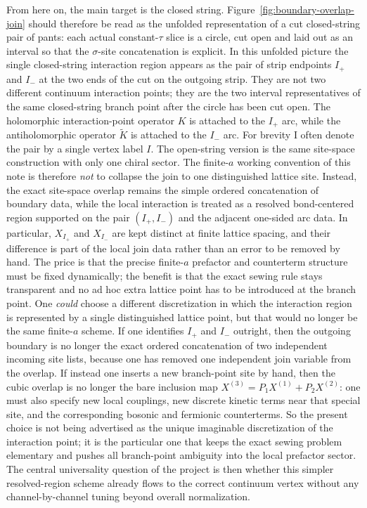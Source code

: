 \documentclass[11pt]{article}
\numberwithin{equation}{section}
\begin{document}
From here on, the main target is the closed string. Figure~\ref{fig:boundary-overlap-join} should therefore be read as the unfolded representation of a cut closed-string pair of pants: each actual constant-$\tau$ slice is a circle, cut open and laid out as an interval so that the $\sigma$-site concatenation is explicit. In this unfolded picture the single closed-string interaction region appears as the pair of strip endpoints $I_+$ and $I_-$ at the two ends of the cut on the outgoing strip. They are not two different continuum interaction points; they are the two interval representatives of the same closed-string branch point after the circle has been cut open. The holomorphic interaction-point operator $K$ is attached to the $I_+$ arc, while the antiholomorphic operator $\widetilde K$ is attached to the $I_-$ arc. For brevity I often denote the pair by a single vertex label $I$. The open-string version is the same site-space construction with only one chiral sector.
The finite-$a$ working convention of this note is therefore \emph{not} to collapse the join to one distinguished lattice site. Instead, the exact site-space overlap remains the simple ordered concatenation of boundary data, while the local interaction is treated as a resolved bond-centered region supported on the pair $(I_+,I_-)$ and the adjacent one-sided arc data. In particular, $X_{I_+}$ and $X_{I_-}$ are kept distinct at finite lattice spacing, and their difference is part of the local join data rather than an error to be removed by hand. The price is that the precise finite-$a$ prefactor and counterterm structure must be fixed dynamically; the benefit is that the exact sewing rule stays transparent and no ad hoc extra lattice point has to be introduced at the branch point.
One \emph{could} choose a different discretization in which the interaction region is represented by a single distinguished lattice point, but that would no longer be the same finite-$a$ scheme. If one identifies $I_+$ and $I_-$ outright, then the outgoing boundary is no longer the exact ordered concatenation of two independent incoming site lists, because one has removed one independent join variable from the overlap. If instead one inserts a new branch-point site by hand, then the cubic overlap is no longer the bare inclusion map $X^{(3)}=P_1X^{(1)}+P_2X^{(2)}$: one must also specify new local couplings, new discrete kinetic terms near that special site, and the corresponding bosonic and fermionic counterterms. So the present choice is not being advertised as the unique imaginable discretization of the interaction point; it is the particular one that keeps the exact sewing problem elementary and pushes all branch-point ambiguity into the local prefactor sector. The central universality question of the project is then whether this simpler resolved-region scheme already flows to the correct continuum vertex without any channel-by-channel tuning beyond overall normalization.
\end{document}
